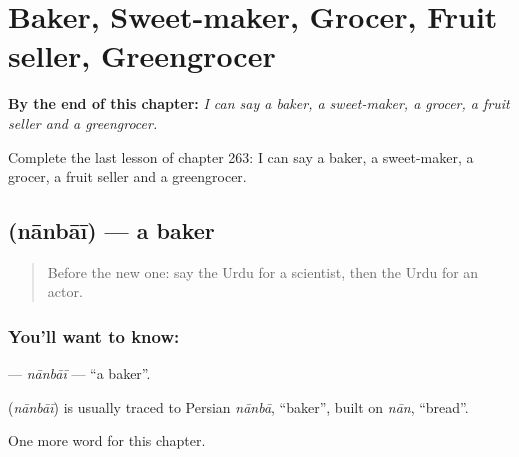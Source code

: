 
\chapter{Baker, Sweet-maker, Grocer, Fruit seller, Greengrocer}
\label{ch:ur-baker-sweet-maker-grocer-fruit-seller-greengrocer}

\begin{chapteropening}
\textbf{By the end of this chapter:} \emph{I can say a baker, a sweet-maker, a grocer, a fruit seller and a greengrocer.}

Complete the last lesson of chapter 263: I can say a baker, a sweet-maker, a grocer, a fruit seller and a greengrocer.
\end{chapteropening}

\section[\texorpdfstring{\ur{نانبائی} (nānbāī)}{نانبائی (nānbāī)}]{ (nānbāī) — a baker}

\label{lesson:UR-C263-nanbai}



\begin{quote}
Before the new one: say the Urdu for a scientist, then the Urdu for an actor.
\end{quote}

\subsection*{You'll want to know: }
\textbf{} — \emph{nānbāī} — \textquotedblleft{}a baker\textquotedblright{}.

\begin{cousinweb}
\textbf{} (\emph{nānbāī}) is usually traced to Persian \emph{nānbā}, \textquotedblleft{}baker\textquotedblright{}, built on \emph{nān}, \textquotedblleft{}bread\textquotedblright{}.
\end{cousinweb}

\begin{grammarlens}[title={What you've built}]
One more word for this chapter.
\end{grammarlens}

